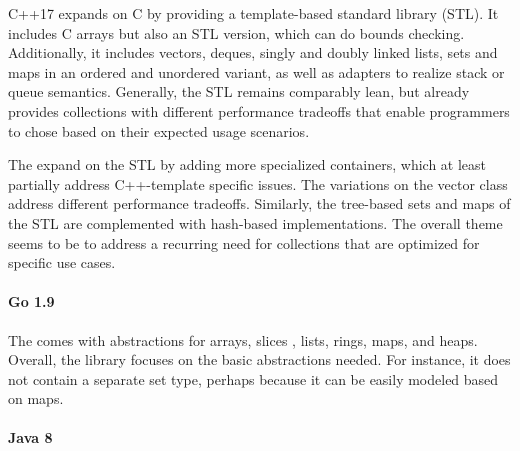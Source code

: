 \documentclass[sigconf, 10pt]{acmart}
\begin{document}
C++17\citep{Cpp17} expands on C
by providing a template-based standard library (STL).
It includes C arrays but also an STL version, which can do bounds checking.
Additionally, it includes vectors, deques, singly and doubly linked lists,
sets and maps in an ordered and unordered variant,
as well as adapters to realize stack or queue semantics.
Generally, the STL remains comparably lean,
but already provides collections with different performance tradeoffs
that enable programmers to chose based on their expected usage scenarios.

The 
expand on the STL by adding more specialized containers,
which at least partially address C++-template specific issues.
The variations on the vector class address different performance tradeoffs.
Similarly, the tree-based sets and maps of the STL are complemented
with hash-based implementations. 
The overall theme seems to be to address a recurring need for collections
that are optimized for specific use cases.

\paragraph{Go 1.9}


The 
comes with abstractions for arrays, slices , lists, rings, maps, and heaps.
Overall, the library focuses on the basic abstractions needed.
For instance, it does not contain a separate set type,
perhaps because it can be easily modeled based on maps.

\paragraph{Java 8}
\end{document}

